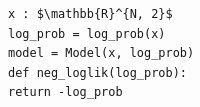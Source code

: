 \documentclass[border=10pt]{standalone}
\begin{document}
\begin{lstlisting}
x : $\mathbb{R}^{N, 2}$
log_prob = log_prob(x)
model = Model(x, log_prob)
def neg_loglik(log_prob):
return -log_prob
\end{lstlisting}
\end{document}

